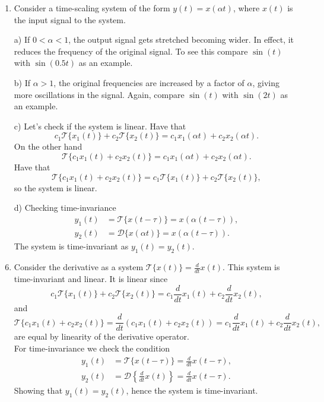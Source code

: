 \begin{enumerate}
\item Consider a time-scaling system of the form $y(t)=x(\alpha t)$, where $x(t)$ is the input signal to the system. 

\item[a)]
If $0<\alpha<1$, the output signal gets stretched becoming wider. In effect, it reduces the frequency of the original signal. To see this compare $\sin(t)$ with $\sin(0.5t)$ as an example. 

\item[b)]
If $\alpha>1$, the original frequencies are increased by a factor of $\alpha$, giving more oscillations in the signal. Again, compare $\sin(t)$ with $\sin(2t)$ as an example.

\item[c)]
Let's check if the system is linear. Have that
$$c_{1}\mathcal{T}\{x_{1}(t)\}+c_{2}\mathcal{T}\{x_{2}(t)\}=c_{1}x_{1}(\alpha t)+c_{2}x_{2}(\alpha t).$$
On the other hand
$$\mathcal{T}\{c_{1}x_{1}(t)+c_{2}x_{2}(t)\}=c_{1}x_{1}(\alpha t)+c_{2}x_{2}(\alpha t).$$
Have that
$$\mathcal{T}\{c_{1}x_{1}(t)+c_{2}x_{2}(t)\}=c_{1}\mathcal{T}\{x_{1}(t)\}+c_{2}\mathcal{T}\{x_{2}(t)\},$$
so the system is linear. 

\item[d)]
Checking time-invariance
\begin{align*}
    y_{1}(t)&=\mathcal{T}\{x(t-\tau)\}=x(\alpha(t-\tau)), \\
    y_{2}(t)&=\mathcal{D}\{x(\alpha t)\}=x(\alpha(t-\tau)).
\end{align*}
The system is time-invariant as $y_{1}(t)=y_{2}(t)$.

\item Consider the derivative as a system $\mathcal{T}\{x(t)\}=\frac{d}{dt}x(t)$. This system is time-invariant and linear. It is linear since
$$c_{1}\mathcal{T}\{x_{1}(t)\}+c_{2}\mathcal{T}\{x_{2}(t)\}=c_{1}\frac{d}{dt}x_{1}(t)+c_{2}\frac{d}{dt}x_{2}(t),$$
and
$$\mathcal{T}\{c_{1}x_{1}(t)+c_{2}x_{2}(t)\}=\frac{d}{dt}(c_{1}x_{1}(t)+c_{2}x_{2}(t))=c_{1}\frac{d}{dt}x_{1}(t)+c_{2}\frac{d}{dt}x_{2}(t),$$
are equal by linearity of the derivative operator. \\
For time-invariance we check the condition
\begin{align*}
    y_{1}(t)&=\mathcal{T}\{x(t-\tau)\}=\frac{d}{dt}x(t-\tau), \\
    y_{2}(t)&=\mathcal{D}\left\{\frac{d}{dt}x(t)\right\}=\frac{d}{dt}x(t-\tau).
\end{align*}
Showing that $y_{1}(t)=y_{2}(t)$, hence the system is time-invariant. 


\end{enumerate}
